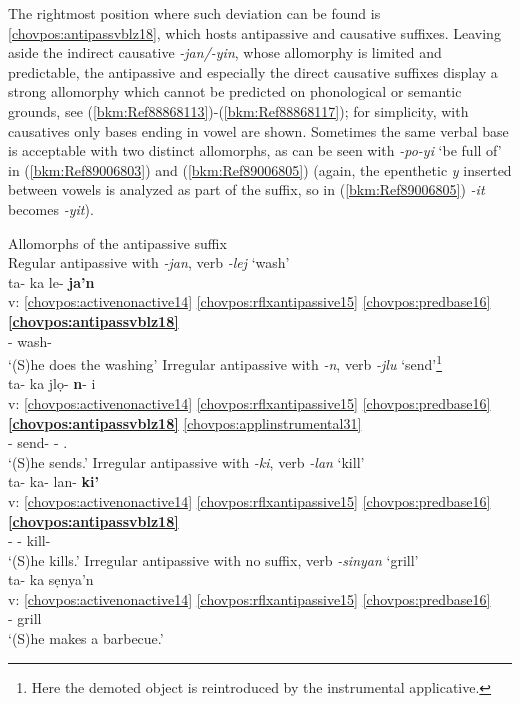 \documentclass[output=paper]{langscibook}
\begin{document}
The rightmost position where such deviation can be found is \ref{chovpos:antipassvblz18}, which hosts antipassive and causative suffixes. Leaving aside the indirect causative \textit{-jan/-yin}, whose allomorphy is limited and predictable, the antipassive and especially the direct causative suffixes display a strong allomorphy which cannot be predicted on phonological or semantic grounds, see (\ref{bkm:Ref88868113}){}-(\ref{bkm:Ref88868117}); for simplicity, with causatives only bases ending in vowel are shown. Sometimes the same verbal base is acceptable with two distinct allomorphs, as can be seen with \textit{-po-yi} `be full of' in (\ref{bkm:Ref89006803}) and (\ref{bkm:Ref89006805}) (again, the epenthetic \textit{y} inserted between vowels is analyzed as part of the suffix, so in (\ref{bkm:Ref89006805}) \textit{-it} becomes \textit{-yit}).

\ea\label{bkm:Ref88868113}Allomorphs of the antipassive suffix\\
    \ea  Regular antipassive with \textit{{}-jan}, verb \textit{-lej} `wash'\\ {
    \glll {} ta- ka le- \textbf{ja'n}\\ 
    v: \ref{chovpos:activenonactive14} \ref{chovpos:rflxantipassive15} \ref{chovpos:predbase16} \textbf{\ref{chovpos:antipassvblz18}}\\
    {} \Third{}- \Antip{} wash- \textbf{\Antip{}}\\
    \glt`(S)he does the washing'
    }
    \ex  Irregular antipassive with \textit{{}-n}, verb \textit{-jlu} `send'\footnote{Here the demoted object is reintroduced by the instrumental applicative.}\\ {
    \glll {} ta- ka jlọ- \textbf{n}{}- i\\
    v: \ref{chovpos:activenonactive14} \ref{chovpos:rflxantipassive15} \ref{chovpos:predbase16} \textbf{\ref{chovpos:antipassvblz18}} \ref{chovpos:applinstrumental31}\\
    {} \Third{}- \Antip{} send- \textbf{\Antip{}}- \Ap.\Ins{}\\
    \glt `(S)he sends.'
    }
    \ex\label{bkm:Ref89007237} Irregular antipassive with \textit{{}-ki}, verb \textit{-lan} `kill'\\ {
    \glll {} ta{}- ka{}- lan{}- \textbf{ki'}\protect\footnotemark\\ 
    v: \ref{chovpos:activenonactive14} \ref{chovpos:rflxantipassive15} \ref{chovpos:predbase16} \textbf{\ref{chovpos:antipassvblz18}}\\ 
    {} \Third{}- \Antip{}- kill- \textbf{\Antip{}}\\ 
    \glt `(S)he kills.'
    }
    \ex  Irregular antipassive with no suffix, verb \textit{-sinyan} `grill'\\{
    \glll ta- ka sẹnya'n\\ 
    v: \ref{chovpos:activenonactive14} \ref{chovpos:rflxantipassive15} \ref{chovpos:predbase16}\\
    \Third{}- \Antip{} grill\\
    \glt `(S)he makes a barbecue.'
    }
    \z
\z 
\end{document}
